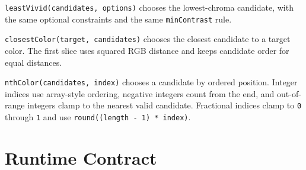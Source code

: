 \texttt{l\allowbreak{}e\allowbreak{}a\allowbreak{}s\allowbreak{}t\allowbreak{}V\allowbreak{}i\allowbreak{}v\allowbreak{}i\allowbreak{}d\allowbreak{}(\allowbreak{}c\allowbreak{}a\allowbreak{}n\allowbreak{}d\allowbreak{}i\allowbreak{}d\allowbreak{}a\allowbreak{}t\allowbreak{}e\allowbreak{}s\allowbreak{},\allowbreak{} \allowbreak{}o\allowbreak{}p\allowbreak{}t\allowbreak{}i\allowbreak{}o\allowbreak{}n\allowbreak{}s\allowbreak{})} chooses the lowest-chroma candidate, with the same optional constraints and the same \texttt{m\allowbreak{}i\allowbreak{}n\allowbreak{}C\allowbreak{}o\allowbreak{}n\allowbreak{}t\allowbreak{}r\allowbreak{}a\allowbreak{}s\allowbreak{}t} rule.

\texttt{c\allowbreak{}l\allowbreak{}o\allowbreak{}s\allowbreak{}e\allowbreak{}s\allowbreak{}t\allowbreak{}C\allowbreak{}o\allowbreak{}l\allowbreak{}o\allowbreak{}r\allowbreak{}(\allowbreak{}t\allowbreak{}a\allowbreak{}r\allowbreak{}g\allowbreak{}e\allowbreak{}t\allowbreak{},\allowbreak{} \allowbreak{}c\allowbreak{}a\allowbreak{}n\allowbreak{}d\allowbreak{}i\allowbreak{}d\allowbreak{}a\allowbreak{}t\allowbreak{}e\allowbreak{}s\allowbreak{})} chooses the closest candidate to a target color. The first slice uses squared RGB distance and keeps candidate order for equal distances.

\texttt{n\allowbreak{}t\allowbreak{}h\allowbreak{}C\allowbreak{}o\allowbreak{}l\allowbreak{}o\allowbreak{}r\allowbreak{}(\allowbreak{}c\allowbreak{}a\allowbreak{}n\allowbreak{}d\allowbreak{}i\allowbreak{}d\allowbreak{}a\allowbreak{}t\allowbreak{}e\allowbreak{}s\allowbreak{},\allowbreak{} \allowbreak{}i\allowbreak{}n\allowbreak{}d\allowbreak{}e\allowbreak{}x\allowbreak{})} chooses a candidate by ordered position. Integer indices use array-style ordering, negative integers count from the end, and out-of-range integers clamp to the nearest valid candidate. Fractional indices clamp to \texttt{0} through \texttt{1} and use \texttt{r\allowbreak{}o\allowbreak{}u\allowbreak{}n\allowbreak{}d\allowbreak{}(\allowbreak{}(\allowbreak{}l\allowbreak{}e\allowbreak{}n\allowbreak{}g\allowbreak{}t\allowbreak{}h\allowbreak{} \allowbreak{}-\allowbreak{} \allowbreak{}1\allowbreak{})\allowbreak{} \allowbreak{}*\allowbreak{} \allowbreak{}i\allowbreak{}n\allowbreak{}d\allowbreak{}e\allowbreak{}x\allowbreak{})}.

\section{Runtime Contract}\label{record-184-runtime-contract}

